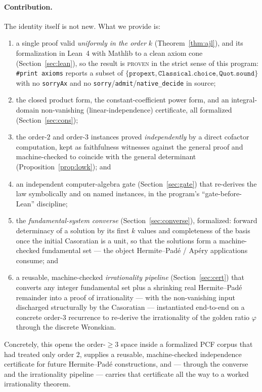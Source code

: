 \documentclass[11pt]{article}
\begin{document}
\paragraph{Contribution.}
The identity itself is not new. What we provide is:
\begin{enumerate}
\item[(i)] a single proof valid \emph{uniformly in the order} $k$
(Theorem~\ref{thm:ajl}), and its formalization in Lean~4 with Mathlib to a clean
axiom cone (Section~\ref{sec:lean}), so the result is \textsc{proven} in the strict
sense of this program: \texttt{\#print axioms} reports a subset of
$\{\texttt{propext},\texttt{Classical.choice},\texttt{Quot.sound}\}$ with no
\texttt{sorryAx} and no \texttt{sorry}/\texttt{admit}/\texttt{native\_decide} in
source;
\item[(ii)] the closed product form, the constant-coefficient power form, and an
integral-domain non-vanishing (linear-independence) certificate, all formalized
(Section~\ref{sec:cons});
\item[(iii)] the order-$2$ and order-$3$ instances proved \emph{independently} by a
direct cofactor computation, kept as faithfulness witnesses against the general
proof and machine-checked to coincide with the general determinant
(Proposition~\ref{prop:lowk}); and
\item[(iv)] an independent computer-algebra gate (Section~\ref{sec:gate}) that
re-derives the law symbolically and on named instances, in the program's
``gate-before-Lean'' discipline;
\item[(v)] the \emph{fundamental-system converse} (Section~\ref{sec:converse}),
formalized: forward determinacy of a solution by its first $k$ values and completeness
of the basis once the initial Casoratian is a unit, so that the solutions form a
machine-checked fundamental set --- the object Hermite--Pad\'e / Ap\'ery applications
consume; and
\item[(vi)] a reusable, machine-checked \emph{irrationality pipeline}
(Section~\ref{sec:cert}) that converts any integer fundamental set plus a shrinking
real Hermite--Pad\'e remainder into a proof of irrationality --- with the non-vanishing
input discharged structurally by the Casoratian --- instantiated end-to-end on a
concrete order-$3$ recurrence to re-derive the irrationality of the golden ratio
$\varphi$ through the discrete Wronskian.
\end{enumerate}
Concretely, this opens the order-$\ge3$ space inside a formalized PCF corpus that had
treated only order $2$, supplies a reusable, machine-checked independence
certificate for future Hermite--Pad\'e constructions, and --- through the converse and
the irrationality pipeline --- carries that certificate all the way to a worked
irrationality theorem.
\end{document}
